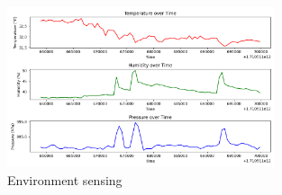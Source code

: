 \documentclass{article}
\begin{document}
    \begin{figure}
        \centering
        \includegraphics[width=0.7\textwidth]{scripts/environment1.png}
        \caption{Environment sensing}
        \label{fig:environment1}
    \end{figure}
\end{document}
